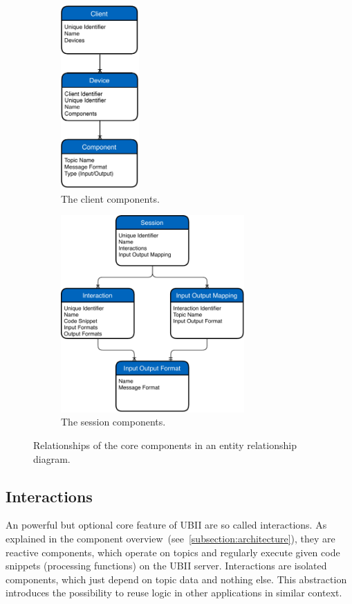 \begin{figure}[htpb]
  \centering
  \begin{subfigure}{.5\textwidth}
    \centering
    \includegraphics[width=3cm]{figures/ubii_er_client.pdf}
    \caption{The client components.}
    \label{fig:ubii_er_client}
  \end{subfigure}%
  \begin{subfigure}{.5\textwidth}
    \centering
    \includegraphics[width=7cm]{figures/ubii_er_server.pdf}
    \caption{The session components.}
    \label{fig:ubii_er_server}
  \end{subfigure}
  \caption[UBII Components Diagram]{Relationships of the core components in an entity relationship diagram.}
  \label{fig:ubii_er}
\end{figure}


\subsection{Interactions}\label{subsection:interactions}
An powerful but optional core feature of \ac{UBII} are so called interactions. As explained in the component overview~(see~\ref{subsection:architecture}), they are reactive components, which operate on topics and regularly execute given code snippets (processing functions) on the \ac{UBII} server. Interactions are isolated components, which just depend on topic data and nothing else. This abstraction introduces the possibility to reuse logic in other applications in similar context. 

